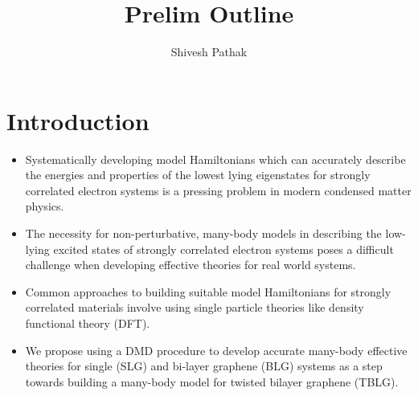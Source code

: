 \documentclass{article}
\title{Prelim Outline}
\author{Shivesh Pathak}
\begin{document}
\section{Introduction}
\begin{itemize}
\item Systematically developing model Hamiltonians which can accurately describe the energies and properties of the lowest lying eigenstates for strongly correlated electron systems is a pressing problem in modern condensed matter physics. 

\item The necessity for non-perturbative, many-body models in describing the low-lying excited states of strongly correlated electron systems poses a difficult challenge when developing effective theories for real world systems.

\item Common approaches to building suitable model Hamiltonians for strongly correlated materials involve using single particle theories like density functional theory (DFT).

\item We propose using a DMD procedure to develop accurate many-body effective theories for single (SLG) and bi-layer graphene (BLG) systems as a step towards building a many-body model for twisted bilayer graphene (TBLG).
\end{itemize}
\end{document}
